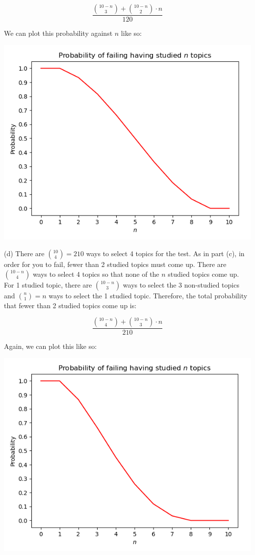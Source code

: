 \documentclass[10pt]{article}
\begin{document}
$$\frac{{10 - n \choose 3} + {{10 - n \choose 2} \cdot n}}{120}$$

We can plot this probability against $n$ like so:

\begin{center}
    \includegraphics[scale=0.5]{q1_c.png}
\end{center}

\noindent (d) There are ${10 \choose 4} = 210$ ways to select 4 topics for the test. As in part (c), in order for you to fail, fewer than 2 studied topics must come up. There are ${10 - n \choose 4}$ ways to select 4 topics so that none of the $n$ studied topics come up. For 1 studied topic, there are ${10 - n \choose 3}$ ways to select the 3 non-studied topics and ${n \choose 1} = n$ ways to select the 1 studied topic. Therefore, the total probability that fewer than 2 studied topics come up is:

$$\frac{{10 - n \choose 4} + {{10 - n \choose 3} \cdot n}}{210}$$

Again, we can plot this like so:

\begin{center}
    \includegraphics[scale=0.5]{q1_d.png}
\end{center}
\end{document}
